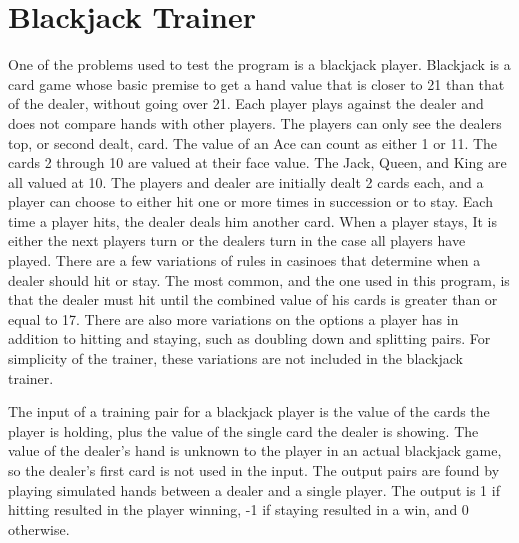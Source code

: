 \chapter[Blackjack Trainer]{Blackjack Trainer}
One of the problems used to test the program is a blackjack player. Blackjack is a card game whose basic premise to get a hand value that is closer to 21 than that of the dealer, without going over 21. Each player plays against the dealer and does not compare hands with other players. The players can only see the dealers top, or second dealt, card. The value of an Ace can count as either 1 or 11. The cards 2 through 10 are valued at their face value. The Jack, Queen, and King are all valued at 10. The players and dealer are initially dealt 2 cards each, and a player can choose to either hit one or more times in succession or to stay. Each time a player hits, the dealer deals him another card. When a player stays, It is either the next players turn or the dealers turn in the case all players have played. There are a few variations of rules in casinoes that determine when a dealer should hit or stay. The most common, and the one used in this program, is that the dealer must hit until the combined value of his cards is greater than or equal to 17. There are also more variations on the options a player has in addition to hitting and staying, such as doubling down and splitting pairs. For simplicity of the trainer, these variations are not included in the blackjack trainer.

The input of a training pair for a blackjack player is the value of the cards the player is holding, plus the value of the single card the dealer is showing. The value of the dealer's hand is unknown to the player in an actual blackjack game, so the dealer's first card is not used in the input. The output pairs are found by playing simulated hands between a dealer and a single player. The output is 1 if hitting resulted in the player winning, -1 if staying resulted in a win, and 0 otherwise.






